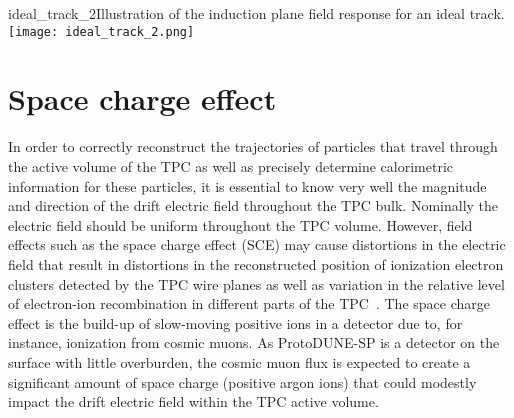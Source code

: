 \begin{cdrfigure}{ideal_track_2}{Illustration of the induction plane field response for an ideal track.}
\texttt{[image: ideal\_track\_2.png]}
\end{cdrfigure}





\section{Space charge effect}

\label{sec:SCEintro}

In order to correctly reconstruct the trajectories of particles that travel through the active volume of the TPC as well as precisely determine calorimetric information for these particles, it is essential to know very well the magnitude and direction of the drift electric field throughout the TPC bulk.  Nominally the electric field should be uniform throughout the TPC volume.  However, field effects such as the space charge effect (SCE) may cause distortions in the electric field that result in distortions in the reconstructed position of ionization electron clusters detected by the TPC wire planes as well as variation in the relative level of electron-ion recombination in different parts of the TPC~\cite{KirkSCE}.  The space charge effect is the build-up of slow-moving positive ions in a detector due to, for instance, ionization from cosmic muons.  As ProtoDUNE-SP is a detector on the surface with little overburden, the cosmic muon flux is expected to create a significant amount of space charge (positive argon ions) that could modestly impact the drift electric field within the TPC active volume.

